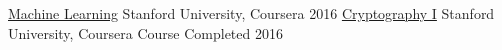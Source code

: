 \begin{cvhonors}
  \cvhonor
    {\href{https://www.coursera.org/learn/machine-learning}{Machine Learning}}
    {Stanford University, Coursera}
    {\href{https://www.coursera.org/account/accomplishments/verify/ZWCUVR3HSXTM}{}}
    {2016}
  \cvhonor
    {\href{https://www.coursera.org/learn/crypto}{Cryptography I}}
    {Stanford University, Coursera}
    {Course Completed}
    {2016}
\end{cvhonors}

